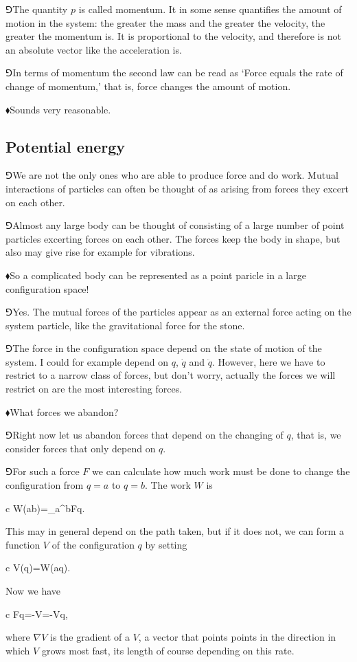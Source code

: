 \documentclass[11pt,oneside%
]{memoir}
\newenvironment{eqna}{\begin{IEEEeqnarray*}{c}}{\end{IEEEeqnarray*}\ignorespacesafterend}
\newcommand{\dd}{\mathrm{d}}
\newcommand{\hea}{\(\blacklozenge\)\;}
\newcommand{\heb}{\(\Game\)\;}
\begin{document}
\heb The quantity \(p\) is called momentum. It in some sense quantifies the amount of motion in the system: the greater the mass and the greater the velocity, the greater the momentum is. It is proportional to the velocity, and therefore is not an absolute vector like the acceleration is.%

\heb In terms of momentum the second law can be read as `Force equals the rate of change of momentum,' that is, force changes the amount of motion.

\hea Sounds very reasonable.%
\subsection{Potential energy}
\heb We are not the only ones who are able to produce force and do work. Mutual interactions of particles can often be thought of as arising from forces they excert on each other.

\heb Almost any large body can be thought of consisting of a large number of point particles excerting forces on each other. The forces keep the body in shape, but also may give rise for example for vibrations.

\hea So a complicated body can be represented as a point paricle in a large configuration space!

\heb Yes. The mutual forces of the particles appear as an external force acting on the system particle, like the gravitational force for the stone.

\heb The force in the configuration space depend on the state of motion of the system. I could for example depend on \(q\), \(\dot{q}\) and \(\ddot{q}\). However, here we have to restrict to a narrow class of forces, but don't worry, actually the forces we will restrict on are the most interesting forces.

\hea What forces we abandon?

\heb Right now let us abandon forces that depend on the changing of \(q\), that is, we consider forces that only depend on \(q\).

\heb For such a force \(F\) we can calculate how much work must be done to change the configuration from \(q=a\) to \(q=b\). The work \(W\) is
\begin{eqna}
    W(a\rightarrow b)=\int_{a}^{b}F\cdot\dd q.
\end{eqna}
This may in general depend on the path taken, but if it does not, we can form a function \(V\) of the configuration \(q\) by setting
\begin{eqna}
    V(q)=W(a\rightarrow q).
\end{eqna}
Now we have%
\begin{eqna}
    F\cdot\dd q=-\dd V=-\nabla V\cdot\dd q,
\end{eqna}
where \(\nabla V\) is the gradient of a \(V\), a vector that points points in the direction in which \(V\) grows most fast, its length of course depending on this rate.
\end{document}
